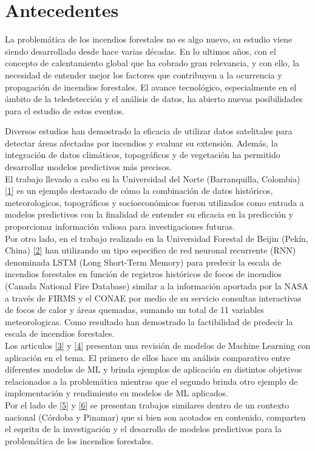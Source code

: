 \section{Antecedentes}
La problemática de los incendios forestales no es algo nuevo, su estudio viene siendo desarrollado desde hace varias décadas. En lo ultimos años, con el concepto de calentamiento global que ha cobrado gran relevancia, y con ello, la necesidad de entender mejor los factores que contribuyen a la ocurrencia y propagación de incendios forestales. El avance tecnológico, especialmente en el ámbito de la teledetección y el análisis de datos, ha abierto nuevas posibilidades para el estudio de estos eventos.

Diversos estudios han demostrado la eficacia de utilizar datos satelitales para detectar áreas afectadas por incendios y evaluar su extensión. Además, la integración de datos climáticos, topográficos y de vegetación ha permitido desarrollar modelos predictivos más precisos. \\

El trabajo llevado a cabo en la Universidad del Norte (Barranquilla, Colombia) \hyperref[sec:refs]{[1]} es un ejemplo destacado de cómo la combinación de datos históricos, meteorologicos, topográficos y socioeconómicos fueron utilizados como entrada a modelos predictivos con la finalidad de entender su eficacia en la predicción y proporcionar información valiosa para investigaciones futuras. \\

Por otro lado, en el trabajo realizado en la Universidad Forestal de Beijin (Pekín, China) \hyperref[sec:refs]{[2]} han utilizando un tipo especifico de red neuronal recurrente (RNN) denominada LSTM (Long Short-Term Memory) para predecir la escala de incendios forestales en función de registros históricos de focos de incendios (Canada National Fire Database) similar a la información aportada por la NASA a través de FIRMS y el CONAE por medio de su servicio consultas interactivas de focos de calor y áreas quemadas, sumando un total de 11 variables meteorologicas. Como resultado han demostrado la factibilidad de predecir la escala de incendios forestales. \\

Los articulos \hyperref[sec:refs]{[3]} y \hyperref[sec:refs]{[4]} presentan una revisión de modelos de Machine Learning con aplicación en el tema. El primero de ellos hace un análisis comparativo entre diferentes modelos de ML y brinda ejemplos de aplicación en distintos objetivos relacionados a la problemática mientras que el segundo brinda otro ejemplo de implementación y rendimiento en modelos de ML aplicados.\\

Por el lado de \hyperref[sec:refs]{[5]} y \hyperref[sec:refs]{[6]} se presentan trabajos similares dentro de un contexto nacional (Córdoba y Pinamar) que si bien son acotados en contenido, comparten el espritu de la investigación y el desarrollo de modelos predictivos para la problemática de los incendios forestales.